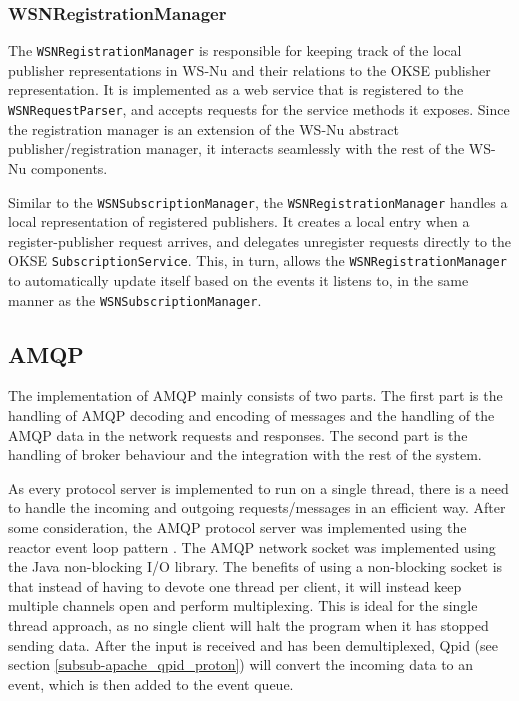 \subsubsection{WSNRegistrationManager}

The \verb!WSNRegistrationManager! is responsible for keeping track of the local publisher representations in WS-Nu and their relations to the OKSE publisher representation. It is implemented as a web service that is registered to the \verb!WSNRequestParser!, and accepts requests for the service methods it exposes. Since the registration manager is an extension of the WS-Nu abstract publisher/registration manager, it interacts seamlessly with the rest of the WS-Nu components.

Similar to the \verb!WSNSubscriptionManager!, the \verb!WSNRegistrationManager! handles a local representation of registered publishers. It creates a local entry when a register-publisher request arrives, and delegates unregister requests directly to the OKSE \verb!SubscriptionService!. This, in turn, allows the \verb!WSNRegistrationManager! to automatically update itself based on the events it listens to, in the same manner as the \verb!WSNSubscriptionManager!.

\subsection{AMQP}
\label{subsec:architecture_and_implementation-implementation-amqp}
The implementation of AMQP mainly consists of two parts. The first part is the handling of AMQP decoding and encoding of messages and the handling of the AMQP data in the network requests and responses. The second part is the handling of broker behaviour and the integration with the rest of the system. 

As every protocol server is implemented to run on a single thread, there is a need to handle the incoming and outgoing requests/messages in an efficient way. After some consideration, the AMQP protocol server was implemented using the reactor event loop pattern \cite{event-loop}. 
The AMQP network socket was implemented using the Java non-blocking I/O library. The benefits of using a non-blocking socket is that instead of having to devote one thread per client, it will instead keep multiple channels open and perform multiplexing. This is ideal for the single thread approach, as no single client will halt the program when it has stopped sending data. After the input is received and has been demultiplexed, Qpid (see section \ref{subsub-apache_qpid_proton}) will convert the incoming data to an event, which is then added to the event queue.


